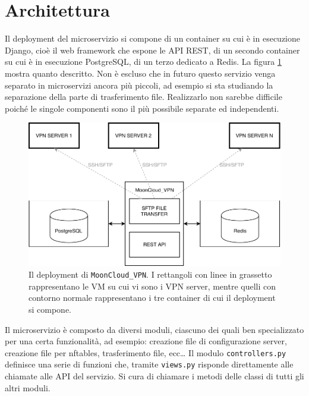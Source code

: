 \section{Architettura}
Il deployment del microservizio si compone di un container
su cui è in esecuzione Django, cioè il web framework che espone le API REST,
di un secondo container su cui è in esecuzione PostgreSQL, di un terzo dedicato
a Redis.
La figura \ref{fig:microservice-deployment} mostra quanto descritto.
Non è escluso che in futuro questo servizio venga separato in microservizi
ancora più piccoli, ad esempio si sta studiando la separazione della
parte di trasferimento file. Realizzarlo non sarebbe
difficile poiché le singole componenti sono il più possibile separate ed independenti.

\begin{figure}
	\includegraphics[scale=0.5]{img/microservice_deployment}
	\caption[Il deployment di \texttt{MoonCloud\_VPN}]{
		Il deployment di \texttt{MoonCloud\_VPN}. I rettangoli con linee in grassetto
		rappresentano le VM su cui vi sono i VPN server, mentre quelli con contorno
		normale rappresentano i tre container di cui il deployment si compone.
	}
	\label{fig:microservice-deployment}
\end{figure}


Il microservizio è composto da diversi moduli, ciascuno dei quali ben
specializzato per una certa funzionalità, ad esempio: creazione file di configurazione
server, creazione file per nftables, trasferimento file, ecc\ldots
Il modulo \texttt{controllers.py}  definisce
una serie di funzioni che, tramite \texttt{views.py} risponde direttamente alle
chiamate alle API del servizio. Si cura di chiamare i metodi delle classi di tutti
gli altri moduli.

